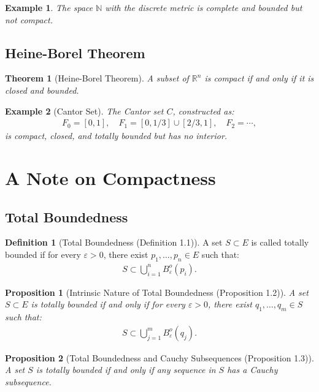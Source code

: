 \documentclass[9pt]{article}
\theoremstyle{definition}
\newtheorem{definition}{Definition}
\theoremstyle{plain}
\newtheorem{theorem}{Theorem}
\newtheorem{proposition}{Proposition}
\newtheorem{example}{Example}
\begin{document}
\begin{example}
The space $ \mathbb{N} $ with the discrete metric is complete and bounded but not compact.
\end{example}

\subsection*{Heine-Borel Theorem}
\begin{theorem}[Heine-Borel Theorem]
A subset of $ \mathbb{R}^n $ is compact if and only if it is closed and bounded.
\end{theorem}

\begin{example}[Cantor Set]
The Cantor set $ C $, constructed as:
\begin{align}
F_0 = [0, 1], \quad F_1 = [0, 1/3] \cup [2/3, 1], \quad F_2 = \cdots,
\end{align}
is compact, closed, and totally bounded but has no interior.
\end{example}
\section*{A Note on Compactness}

\subsection*{Total Boundedness}
\begin{definition}[Total Boundedness (Definition 1.1)]
A set $ S \subset E $ is called totally bounded if for every $ \varepsilon > 0 $, there exist $ p_1, \ldots, p_n \in E $ such that:
\begin{align}
S \subset \bigcup_{i=1}^n B_\varepsilon^o(p_i).
\end{align}
\end{definition}

\begin{proposition}[Intrinsic Nature of Total Boundedness (Proposition 1.2)]
A set $ S \subset E $ is totally bounded if and only if for every $ \varepsilon > 0 $, there exist $ q_1, \ldots, q_m \in S $ such that:
\begin{align}
S \subset \bigcup_{j=1}^m B_\varepsilon^o(q_j).
\end{align}
\end{proposition}

\begin{proposition}[Total Boundedness and Cauchy Subsequences (Proposition 1.3)]
A set $ S $ is totally bounded if and only if any sequence in $ S $ has a Cauchy subsequence.
\end{proposition}
\end{document}
